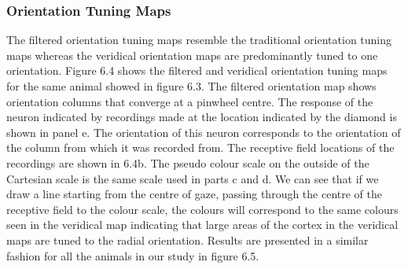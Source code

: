 		\subsubsection{Orientation Tuning Maps}
			The filtered orientation tuning maps resemble the traditional orientation tuning maps whereas the veridical orientation maps are predominantly tuned to one orientation. Figure 6.4 shows the filtered and veridical orientation tuning maps for the same animal showed in figure 6.3. The filtered orientation map shows orientation columns that converge at a pinwheel centre. The response of the neuron indicated by recordings made at the location indicated by the diamond is shown in panel e. The orientation of this neuron corresponds to the orientation of the column from which it was recorded from. The receptive field locations of the recordings are shown in 6.4b. The pseudo colour scale on the outside of the Cartesian scale is the same scale used in parts c and d. We can see that if we draw a line starting from the centre of gaze, passing through the centre of the receptive field to the colour scale, the colours will correspond to the same colours seen in the veridical map indicating that large areas of the cortex in the veridical maps are tuned to the radial orientation. Results are presented in a similar fashion for all the animals in our study in figure 6.5.
			
